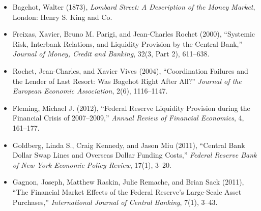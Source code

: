 \begin{itemize}

\item Bagehot, Walter (1873),
\emph{Lombard Street: A Description of the Money Market},
London: Henry S. King and Co.

\item Freixas, Xavier, Bruno M. Parigi, and Jean-Charles Rochet (2000),
``Systemic Risk, Interbank Relations, and Liquidity Provision by the Central Bank,''
\emph{Journal of Money, Credit and Banking}, 32(3, Part 2), 611--638.

\item Rochet, Jean-Charles, and Xavier Vives (2004),
``Coordination Failures and the Lender of Last Resort: Was Bagehot Right After All?''
\emph{Journal of the European Economic Association}, 2(6), 1116--1147.

\item Fleming, Michael J. (2012),
``Federal Reserve Liquidity Provision during the Financial Crisis of 2007--2009,''
\emph{Annual Review of Financial Economics}, 4, 161--177.

\item Goldberg, Linda S., Craig Kennedy, and Jason Miu (2011),
``Central Bank Dollar Swap Lines and Overseas Dollar Funding Costs,''
\emph{Federal Reserve Bank of New York Economic Policy Review}, 17(1), 3--20.

\item Gagnon, Joseph, Matthew Raskin, Julie Remache, and Brian Sack (2011),
``The Financial Market Effects of the Federal Reserve's Large-Scale Asset Purchases,''
\emph{International Journal of Central Banking}, 7(1), 3--43.

\end{itemize}



